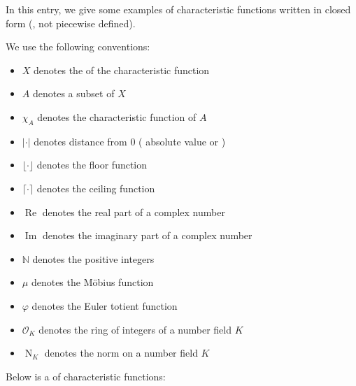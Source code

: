 \documentclass[12pt]{article}
\newcommand{\ipart}{\operatorname{Im}}
\newcommand{\norm}{\operatorname{N}}
\newcommand{\order}{\mathcal{O}}
\newcommand{\real}{\operatorname{Re}}
\begin{document}

In this entry, we give some examples of characteristic functions written in closed form (, not piecewise defined).

We use the following conventions:

\begin{itemize}
\item $X$ denotes the  of the characteristic function
\item $A$ denotes a subset of $X$
\item $\chi_A$ denotes the characteristic function of $A$
\item $|\cdot|$ denotes distance from $0$ ( absolute value or )
\item $\lfloor\cdot\rfloor$ denotes the floor function
\item $\lceil\cdot\rceil$ denotes the ceiling function
\item $\real$ denotes the real part of a complex number
\item $\ipart$ denotes the imaginary part of a complex number
\item $\mathbb{N}$ denotes the positive integers
\item $\mu$ denotes the M\"{o}bius function
\item $\varphi$ denotes the Euler totient function
\item $\order_K$ denotes the ring of integers of a number field $K$
\item $\norm_K$ denotes the norm on a number field $K$
\end{itemize}

Below is a  of characteristic functions:
\end{document}

